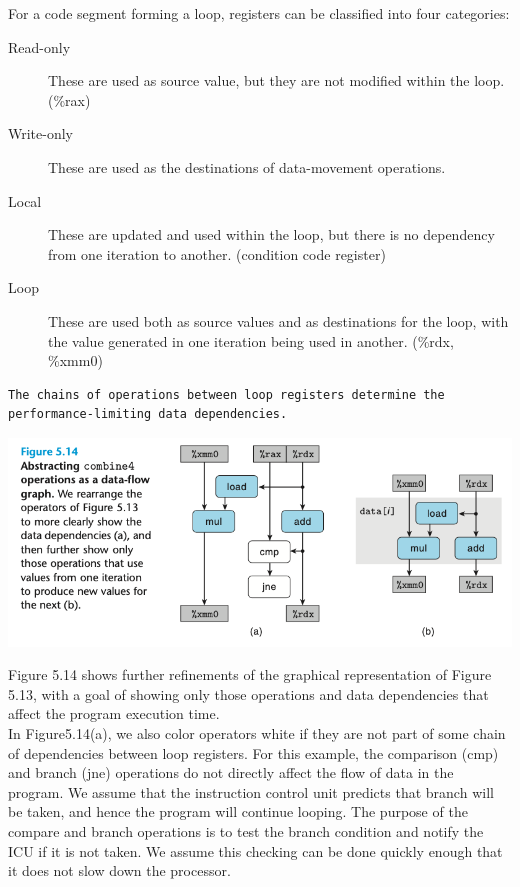 \documentclass[11pt]{article}
\begin{document}
\begin{enumerate}
For a code segment forming a loop, registers can be classified into four categories:\\
\begin{description}
\item[{Read-only}] These are used as source value, but they are not modified within the loop. (\%rax)\\
\item[{Write-only}] These are used as the destinations of data-movement operations.\\
\item[{Local}] These are updated and used within the loop, but there is no dependency from one iteration to another. (condition code register)\\
\item[{Loop}] These are used both as source values and as destinations for the loop, with the value generated in one iteration being used in another. (\%rdx, \%xmm0)\\
\end{description}

\begin{verbatim}
The chains of operations between loop registers determine the performance-limiting data dependencies.
\end{verbatim}

\begin{center}
\includegraphics[width=.9\linewidth]{pics/figure5.14-abstracting-combine4-operations-as-a-data-flow-graph.png}
\end{center}

Figure 5.14 shows further refinements of the graphical representation of Figure 5.13, with a goal of showing only those operations and data dependencies that affect the program execution time.\\

In Figure5.14(a), we also color operators white if they are not part of some chain of dependencies between loop registers. For this example, the comparison (cmp) and branch (jne) operations do not directly affect the flow of data in the program. We assume that the instruction control unit predicts that branch will be taken, and hence the program will continue looping. The purpose of the compare and branch operations is to test the branch condition and notify the ICU if it is not taken. We assume this checking can be done quickly enough that it does not slow down the processor.\\



\end{enumerate}
\end{document}
